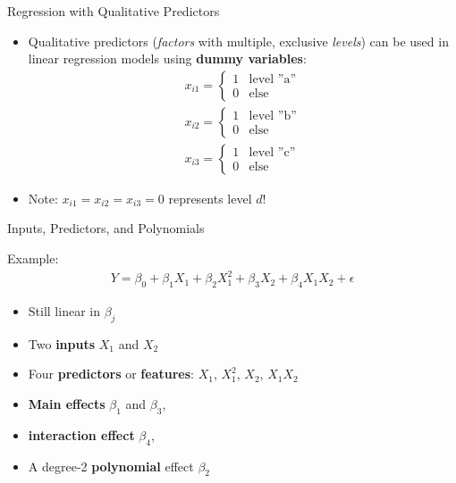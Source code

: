 \documentclass[ignorenonframetext,xcolor=x11names]{beamer}
\begin{document}
\begin{frame}{Regression with Qualitative Predictors}
\begin{itemize}
  \item Qualitative predictors (\emph{factors} with multiple, exclusive \emph{levels}) can be used in linear regression models using \textbf{dummy variables}:
\begin{align*}
x_{i1} = \begin{cases}
1 & \text{level ''a''} \\
0 & \text{else}
\end{cases} \\
x_{i2} = \begin{cases}
1 & \text{level ''b''} \\
0 & \text{else}
\end{cases} \\
x_{i3} = \begin{cases}
1 & \text{level ''c''} \\
0 & \text{else}
\end{cases}
\end{align*}
\item Note: $x_{i1} = x_{i2} = x_{i3} = 0$ represents level $d$!
\end{itemize}
\end{frame}

\begin{frame}{Inputs, Predictors, and Polynomials}

Example:
\begin{align*}
Y = \beta_0 + \beta_1 X_1 + \beta_2 X_1^2 + \beta_3 X_2 + \beta_4 X_1 X_2 + \epsilon
\end{align*}
\begin{itemize}
  \item Still linear in $\beta_j$
  \item Two \textbf{inputs} $X_1$ and $X_2$
  \item Four \textbf{predictors} or \textbf{features}: $X_1$, $X_1^2$, $X_2$, $X_1 X_2$
  \item \textbf{Main effects} $\beta_1$ and $\beta_3$, 
  \item \textbf{interaction effect} $\beta_4$, 
  \item A degree-2 \textbf{polynomial} effect $\beta_2$
\end{itemize}
\end{frame}
\end{document}
